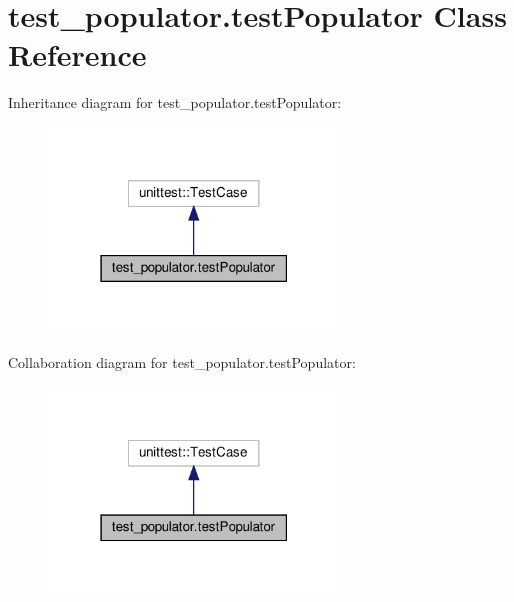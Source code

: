 \hypertarget{classtest__populator_1_1testPopulator}{}\section{test\+\_\+populator.\+test\+Populator Class Reference}
\label{classtest__populator_1_1testPopulator}


Inheritance diagram for test\+\_\+populator.\+test\+Populator\+:
\nopagebreak
\begin{figure}[H]
\begin{center}
\leavevmode
\includegraphics[width=219pt]{classtest__populator_1_1testPopulator__inherit__graph}
\end{center}
\end{figure}


Collaboration diagram for test\+\_\+populator.\+test\+Populator\+:
\nopagebreak
\begin{figure}[H]
\begin{center}
\leavevmode
\includegraphics[width=219pt]{classtest__populator_1_1testPopulator__coll__graph}
\end{center}
\end{figure}
